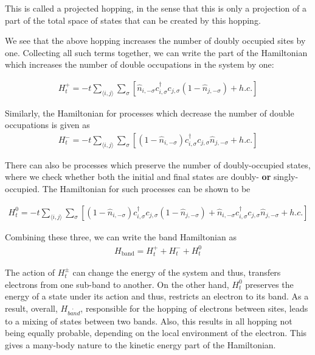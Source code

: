 \documentclass[]{report}
\begin{document}
This is called a projected hopping, in the sense that this is only a projection of a part of the total space of states that can be created by this hopping.

We see that the above hopping increases the number of doubly occupied sites by one. Collecting all such terms together, we can write the part of the Hamiltonian which increases the number of double occupations in the system by one:

\begin{align}\label{eqn:Ht+}
H^{+}_{t} = -t \sum_{\langle i, j \rangle} \sum_{\sigma} \left[ \hat{n}_{i, -\sigma} c^{\dagger}_{i, \sigma} c_{j, \sigma} (1 - \hat{n}_{j, -\sigma}) + h.c.\right]
\end{align}

Similarly, the Hamiltonian for processes which decrease the number of double occupations is given as
\begin{align}\label{eqn:Ht-}
	H^{-}_{t} = -t \sum_{\langle i, j \rangle} \sum_{\sigma} \left[ (1 - \hat{n}_{i, -\sigma}) c^{\dagger}_{i, \sigma} c_{j, \sigma} \hat{n}_{j, -\sigma} + h.c.\right]
\end{align}

There can also be processes which preserve the number of doubly-occupied states, where we check whether both the initial and final states are doubly- \textbf{or} singly-occupied. The Hamiltonian for such processes can be shown to be

\begin{align}\label{eqn:Ht0}
	H^{0}_{t} = -t \sum_{\langle i, j \rangle} \sum_{\sigma} \left[ (1 - \hat{n}_{i, -\sigma}) c^{\dagger}_{i, \sigma} c_{j, \sigma} (1 - \hat{n}_{j, -\sigma}) + \hat{n}_{i, -\sigma} c^{\dagger}_{i, \sigma} c_{j, \sigma} \hat{n}_{j, -\sigma} + h.c.\right]
\end{align}

Combining these three, we can write the band Hamiltonian as
\begin{align}\label{eqn:hband}
	H_{\mathrm{band}} = H^{+}_{t} + H^{-}_{t} + H^{0}_{t}
\end{align}

The action of $ H^{\pm}_{t} $ can change the energy of the system and thus, transfers electrons from one sub-band to another. On the other hand, $ H^{0}_{t} $ preserves the energy of a state under its action and thus, restricts an electron to its band. As a result, overall, $ H_{\mathring{band}} $, responsible for the hopping of electrons between sites, leads to a mixing of states between two bands. Also, this results in all hopping not being equally probable, depending on the local environment of the electron. This gives a many-body nature to the kinetic energy part of the Hamiltonian.
\end{document}
